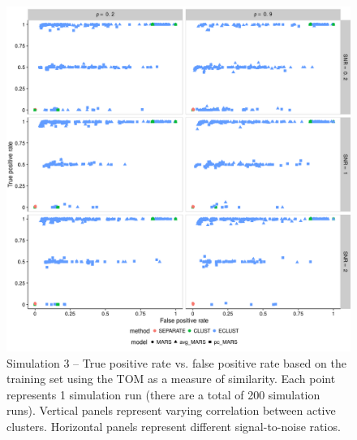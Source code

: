 \begin{figure}
	\includegraphics[scale=0.6, keepaspectratio]{./figs/hydra/results/figures/sim3-sept27/tpr_fpr_TOM_sim3.png}
	\caption{Simulation 3 -- True positive rate vs. false positive rate based on the training set using the TOM as a measure of similarity. Each point represents 1 simulation run (there are a total of 200 simulation runs). Vertical panels represent varying correlation between active clusters. Horizontal panels represent different signal-to-noise ratios.}
	\label{fig:tpr_fpr_TOM_sim3}
\end{figure}


